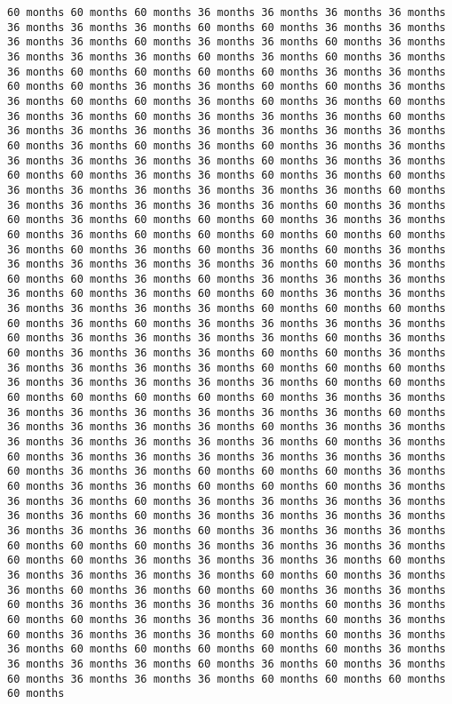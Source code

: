 \documentclass[11pt]{article}
\begin{document}
\begin{Verbatim}[commandchars=\\\{\}, frame=single, framerule=2mm, rulecolor=\color{outerrorbackground}]
60 months 60 months 60 months 36 months 36 months 36 months 36 months 36 months 36 months 36 months 60 months 60 months 36 months 36 months 36 months 36 months 60 months 36 months 36 months 60 months 36 months 36 months 36 months 36 months 60 months 36 months 60 months 36 months 36 months 60 months 60 months 60 months 60 months 36 months 36 months 60 months 60 months 36 months 36 months 60 months 60 months 36 months 36 months 60 months 60 months 36 months 60 months 36 months 60 months 36 months 36 months 60 months 36 months 36 months 36 months 60 months 36 months 36 months 36 months 36 months 36 months 36 months 36 months 60 months 36 months 60 months 36 months 60 months 36 months 36 months 36 months 36 months 36 months 36 months 60 months 36 months 36 months 60 months 60 months 36 months 36 months 60 months 36 months 60 months 36 months 36 months 36 months 36 months 36 months 36 months 60 months 36 months 36 months 36 months 36 months 36 months 60 months 36 months 60 months 36 months 60 months 60 months 60 months 36 months 36 months 60 months 36 months 60 months 60 months 60 months 60 months 60 months 36 months 60 months 36 months 60 months 36 months 60 months 36 months 36 months 36 months 36 months 36 months 36 months 60 months 36 months 60 months 60 months 36 months 60 months 36 months 36 months 36 months 36 months 60 months 36 months 60 months 60 months 36 months 36 months 36 months 36 months 36 months 36 months 60 months 60 months 60 months 60 months 36 months 60 months 36 months 36 months 36 months 36 months 60 months 36 months 36 months 36 months 36 months 60 months 36 months 60 months 36 months 36 months 36 months 60 months 60 months 36 months 36 months 36 months 36 months 36 months 60 months 60 months 60 months 36 months 36 months 36 months 36 months 36 months 60 months 60 months 60 months 60 months 60 months 60 months 60 months 36 months 36 months 36 months 36 months 36 months 36 months 36 months 36 months 60 months 36 months 36 months 36 months 36 months 60 months 36 months 36 months 36 months 36 months 36 months 36 months 36 months 60 months 36 months 60 months 36 months 36 months 36 months 36 months 36 months 36 months 60 months 36 months 36 months 60 months 60 months 60 months 36 months 60 months 36 months 36 months 60 months 60 months 60 months 36 months 36 months 36 months 60 months 36 months 36 months 36 months 36 months 36 months 36 months 60 months 36 months 36 months 36 months 36 months 36 months 36 months 36 months 60 months 36 months 36 months 36 months 60 months 60 months 60 months 36 months 36 months 36 months 36 months 60 months 60 months 36 months 36 months 36 months 36 months 60 months 36 months 36 months 36 months 36 months 60 months 60 months 36 months 36 months 60 months 36 months 60 months 60 months 36 months 36 months 60 months 36 months 36 months 36 months 36 months 60 months 36 months 60 months 60 months 36 months 36 months 36 months 60 months 36 months 60 months 36 months 36 months 36 months 60 months 60 months 36 months 36 months 60 months 60 months 60 months 60 months 60 months 36 months 36 months 36 months 36 months 60 months 36 months 60 months 36 months 60 months 36 months 36 months 36 months 60 months 60 months 60 months 60 months 
\end{Verbatim}
\end{document}
